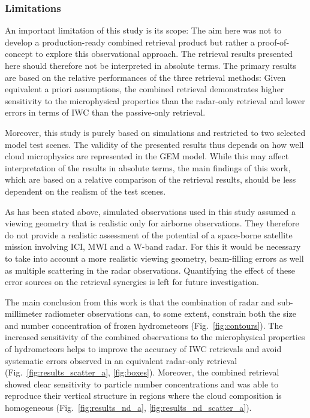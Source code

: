 \documentclass[journal abbreviation, manuscript]{copernicus}
\begin{document}
\subsubsection{Limitations}

An important limitation of this study is its scope: The aim here was not to
develop a production-ready combined retrieval product but rather a
proof-of-concept to explore this observational approach. The retrieval results
presented here should therefore not be interpreted in absolute terms. The
primary results are based on the relative performances of the three retrieval
methods: Given equivalent a priori assumptions, the combined retrieval
demonstrates higher sensitivity to the microphysical properties than the
radar-only retrieval and lower errors in terms of IWC than the passive-only
retrieval.

Moreover, this study is purely based on simulations and restricted to two
selected model test scenes. The validity of the presented results thus depends
on how well cloud microphysics are represented in the GEM model. While this may
affect interpretation of the results in absolute terms, the main findings of
this work, which are based on a relative comparison of the retrieval results,
should be less dependent on the realism of the test scenes.

As has been stated above, simulated observations used in this study assumed a
viewing geometry that is realistic only for airborne observations. They
therefore do not provide a realistic assessment of the potential of a
space-borne satellite mission involving ICI, MWI and a W-band radar. For this it
would be necessary to take into account a more realistic viewing geometry,
beam-filling errors as well as multiple scattering in the radar observations.
Quantifying the effect of these error sources on the retrieval synergies is
left for future investigation.

\conclusions  %
\label{sec:conclusions}

The main conclusion from this work is that the combination of radar and
sub-millimeter radiometer observations can, to some extent, constrain both the
size and number concentration of frozen hydrometeors (Fig.~\ref{fig:contours}).
The increased sensitivity of the combined observations to the microphysical
properties of hydrometeors helps to improve the accuracy of IWC retrievals and
avoid systematic errors observed in an equivalent radar-only retrieval
(Fig.~\ref{fig:results_scatter_a}, \ref{fig:boxes}). Moreover, the combined
retrieval showed clear sensitivity to particle number concentrations and was
able to reproduce their vertical structure in regions where the cloud
composition is homogeneous (Fig.~\ref{fig:results_nd_a},
\ref{fig:results_nd_scatter_a}).
\end{document}
